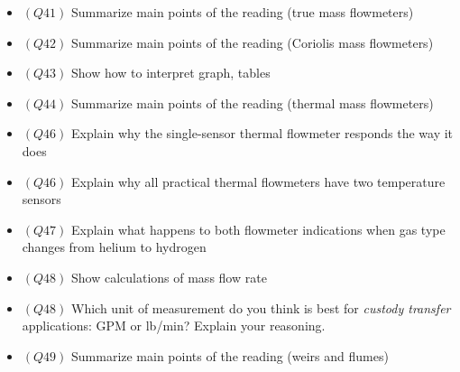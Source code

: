 \begin{itemize}
\item{$(Q41)$} Summarize main points of the reading (true mass flowmeters)
\item{$(Q42)$} Summarize main points of the reading (Coriolis mass flowmeters)
\item{$(Q43)$} Show how to interpret graph, tables
\item{$(Q44)$} Summarize main points of the reading (thermal mass flowmeters)
\item{$(Q46)$} Explain why the single-sensor thermal flowmeter responds the way it does
\item{$(Q46)$} Explain why all practical thermal flowmeters have two temperature sensors
\item{$(Q47)$} Explain what happens to both flowmeter indications when gas type changes from helium to hydrogen
\item{$(Q48)$} Show calculations of mass flow rate
\item{$(Q48)$} Which unit of measurement do you think is best for {\it custody transfer} applications: GPM or lb/min?  Explain your reasoning.
\item{$(Q49)$} Summarize main points of the reading (weirs and flumes)
\medskip


\end{itemize}
